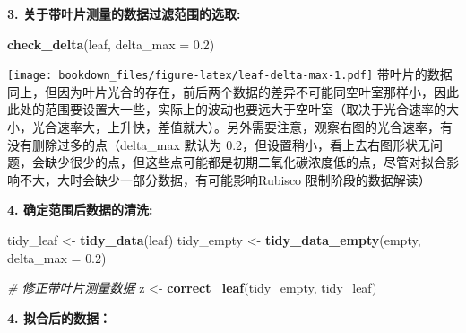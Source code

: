 \documentclass[
]{krantz}
\makeatletter
\newenvironment{Shaded}{\begin{snugshade}}{\end{snugshade}}
\newcommand{\CommentTok}[1]{\textcolor[rgb]{0.56,0.35,0.01}{\textit{#1}}}
\newcommand{\DataTypeTok}[1]{\textcolor[rgb]{0.13,0.29,0.53}{#1}}
\newcommand{\FloatTok}[1]{\textcolor[rgb]{0.00,0.00,0.81}{#1}}
\newcommand{\KeywordTok}[1]{\textcolor[rgb]{0.13,0.29,0.53}{\textbf{#1}}}
\newcommand{\NormalTok}[1]{#1}
\newcommand{\OperatorTok}[1]{\textcolor[rgb]{0.81,0.36,0.00}{\textbf{#1}}}
\newcommand{\StringTok}[1]{\textcolor[rgb]{0.31,0.60,0.02}{#1}}
\newenvironment{kframe}{%
\medskip{}
\setlength{\fboxsep}{.8em}
 \def\at@end@of@kframe{}%
 \ifinner\ifhmode%
  \def\at@end@of@kframe{\end{minipage}}%
  \begin{minipage}{\columnwidth}%
 \fi\fi%
 \def\FrameCommand##1{\hskip\@totalleftmargin \hskip-\fboxsep
 \colorbox{shadecolor}{##1}\hskip-\fboxsep
     \hskip-\linewidth \hskip-\@totalleftmargin \hskip\columnwidth}%
 \MakeFramed {\advance\hsize-\width
   \@totalleftmargin\z@ \linewidth\hsize
   \@setminipage}}%
 {\par\unskip\endMakeFramed%
 \at@end@of@kframe}
\renewenvironment{Shaded}{\begin{kframe}}{\end{kframe}}
\makeatother
\begin{document}
\textbf{3. 关于带叶片测量的数据过滤范围的选取:}

\begin{Shaded}
\begin{Highlighting}[]
\KeywordTok{check\_delta}\NormalTok{(leaf, }\DataTypeTok{delta\_max =} \FloatTok{0.2}\NormalTok{)}
\end{Highlighting}
\end{Shaded}

\texttt{[image: bookdown\_files/figure-latex/leaf-delta-max-1.pdf]}
带叶片的数据同上，但因为叶片光合的存在，前后两个数据的差异不可能同空叶室那样小，因此此处的范围要设置大一些，实际上的波动也要远大于空叶室（取决于光合速率的大小，光合速率大，上升快，差值就大）。另外需要注意，观察右图的光合速率，有没有删除过多的点（delta\_max 默认为 0.2，但设置稍小，看上去右图形状无问题，会缺少很少的点，但这些点可能都是初期二氧化碳浓度低的点，尽管对拟合影响不大，大时会缺少一部分数据，有可能影响Rubisco 限制阶段的数据解读）

\textbf{4. 确定范围后数据的清洗:}

\begin{Shaded}
\begin{Highlighting}[]
\NormalTok{tidy\_leaf \textless{}{-}}\StringTok{ }\KeywordTok{tidy\_data}\NormalTok{(leaf)}
\NormalTok{tidy\_empty \textless{}{-}}\StringTok{ }\KeywordTok{tidy\_data\_empty}\NormalTok{(empty, }\DataTypeTok{delta\_max =} \FloatTok{0.2}\NormalTok{)}

\CommentTok{\# 修正带叶片测量数据}
\NormalTok{z \textless{}{-}}\StringTok{ }\KeywordTok{correct\_leaf}\NormalTok{(tidy\_empty, tidy\_leaf)}
\end{Highlighting}
\end{Shaded}

\textbf{4. 拟合后的数据：}

\begin{Shaded}
\end{Shaded}
\end{document}
